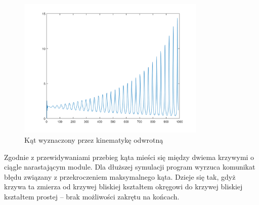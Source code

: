\documentclass[a4paper, 12pt]{report}
\begin{document}
				\begin{figure}[H]
					\centering
					\includegraphics[width = 0.8\textwidth]{./AP/img/rev/lissajous_1_in_3.png}
					\caption{Kąt wyznaczony przez kinematykę odwrotną}
				\end{figure}
				\noindent Zgodnie z przewidywaniami przebieg kąta mieści się między dwiema krzywymi o ciągle narastającym module. Dla dłuższej symulacji program wyrzuca komunikat błędu związany z przekroczeniem maksymalnego kąta. Dzieje się tak, gdyż krzywa ta zmierza od krzywej bliskiej kształtem okręgowi do krzywej bliskiej kształtem prostej -- brak możliwości zakrętu na końcach.
			\newpage
\end{document}
